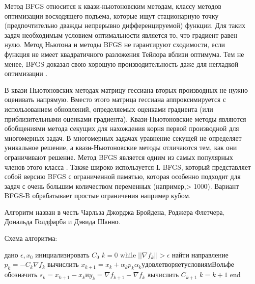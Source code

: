 \documentclass[12pt, a4paper]{extarticle}
\begin{document}
Метод BFGS относится к квази-ньютоновским методам, классу методов оптимизации восходящего подъема, которые ищут стационарную точку (предпочтительно дважды непрерывно дифференцируемой) функции. Для таких задач необходимым условием оптимальности является то, что градиент равен нулю. Метод Ньютона и методы BFGS не гарантируют сходимости, если функция не имеет квадратичного разложения Тейлора вблизи оптимума. Тем не менее, BFGS доказал свою хорошую производительность даже для негладкой оптимизации \cite{7}.

В квази-Ньютоновских методах матрицу гессиана вторых производных не нужно оценивать напрямую. Вместо этого матрица гессиана аппроксимируется с использованием обновлений, определяемых оценками градиента (или приблизительными оценками градиента). Квази-Ньютоновские методы являются обобщениями метода секущих для нахождения корня первой производной для многомерных задач. В многомерных задачах уравнение секущей не определяет уникальное решение, а квази-Ньютоновские методы отличаются тем, как они ограничивают решение. Метод BFGS является одним из самых популярных членов этого класса \cite{8}. Также широко используется L-BFGS, который представляет собой версию BFGS с ограниченной памятью, которая особенно подходит для задач с очень большим количеством переменных (например,> 1000). Вариант BFGS-B \cite{9} обрабатывает простые ограничения например кубом.

Алгоритм назван в честь Чарльза Джорджа Бройдена, Роджера Флетчера, Дональда Голдфарба и Дэвида Шанно.

Схема алгоритма:
\begin{flushleft}
дано $ \epsilon , x_{0} $ \newline
инициализировать $C_{0}$ \newline
$ k=0$ \newline
while $||\nabla f_{k}||>\epsilon$ \newline
найти направление $p_{k}=-C_{k}\nabla f_{k}$ \newline
вычислить $x_{k+1}=x_{k}+\alpha _{k}p_{k} \alpha _{k} удовлетворяет условиям Вольфе $ \newline
обозначить $s_{k}=x_{k+1}-x_{k} и y_{k}=\nabla f_{k+1}-\nabla f_{k} $ \newline
вычислить $C_{k+1}$ \newline
$ k=k+1$ \newline
end \newline
\end{flushleft}
\end{document}
